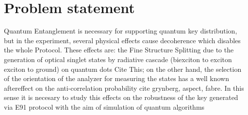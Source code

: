 \section{Problem statement}

Quantum Entanglement is necessary for supporting quantum key distribution, but in the experiment, several physical effects cause decoherence which disables the whole Protocol.
These effects are: the Fine Structure Splitting due to the generation of optical singlet states by radiative cascade (biexciton to exciton exciton to ground) on quantum dots {\huge Cite This}; on the other hand, the selection of the orientation of the analyzer for measuring the states has a well known aftereffect on the anti-correlation probability {\huge cite grynberg, aspect, fabre}.
In this sense it is necesary to study this effects on the robustness of the key generated via E91 protocol with the aim of simulation of quantum algorithms



